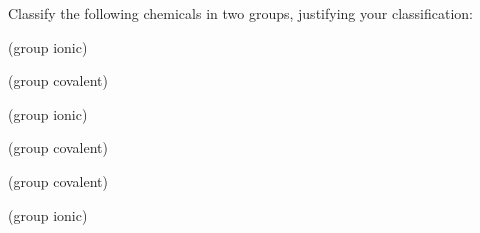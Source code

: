 \documentclass[main.tex]{subfiles}
\begin{document}
\begin{multicols*}{2}
\begin{question}[ID=\the\value{numA}]
Classify the following chemicals in two groups, justifying your classification:
\begin{inparaenum}[(a)]
\item {}  %
\item {} %
\item {} %
\item {}%
\item {}%
\item {} %
\end{inparaenum}
\end{question}
\begin{solution}
\begin{inparaenum}[(a)]
\item {}   (group ionic)
\item {}  (group covalent)
\item {}  (group ionic)
\item {} (group covalent)
\item {} (group covalent)
\item {}  (group ionic)
\end{inparaenum}\hspace{0.1cm}\end{solution}



\end{multicols*}
\end{document}
